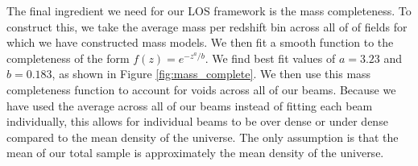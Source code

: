 The final ingredient we need for our LOS framework is the mass completeness. To construct this, we take the average mass per redshift bin across all of of fields for which we have constructed mass models. We then fit a smooth function to the completeness of the form $f(z) = e^{-z^a / b}$. We find best fit values of $a = 3.23$ and $b = 0.183$, as shown in Figure \ref{fig:mass_complete}. We then use this mass completeness function to account for voids across all of our beams. Because we have used the average across all of our beams instead of fitting each beam individually, this allows for individual beams to be over dense or under dense compared to the mean density of the universe. The only assumption is that the mean of our total sample is approximately the mean density of the universe.  
  
  
